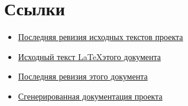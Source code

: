 \documentclass[a4paper,11pt]{article}
\begin{document}
  \newpage
\part{Ссылки}
  \begin{itemize}
    \item \href{https://github.com/DziedMaroz/Cube/tree/ColorCube/src/Cube}{Последняя ревизия исходных текстов проекта}
    \item \href{https://github.com/DziedMaroz/Cube/blob/ColorCube/readme/readme.tex}{Исходный текст \LaTeX   этого документа}
    \item \href{https://github.com/DziedMaroz/Cube/blob/ColorCube/readme/readme.pdf?raw=true}{Последняя ревизия этого документа}
    \item \href{http://dziedmaroz.github.com/colorcube/}{Сгенерированная документация проекта} 
  \end{itemize}
\end{document}
